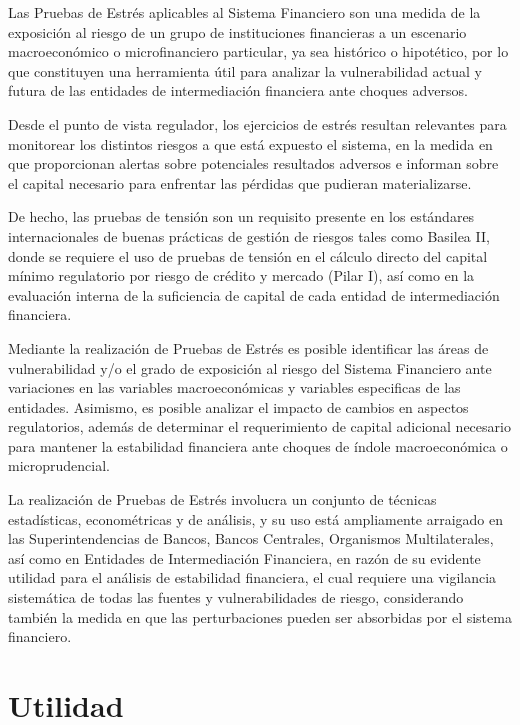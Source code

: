 \documentclass[
  12pt,
]{krantz}
\begin{document}
Las Pruebas de Estrés aplicables al Sistema Financiero son una medida de la exposición al riesgo de un grupo de instituciones financieras a un escenario macroeconómico o microfinanciero particular, ya sea histórico o hipotético, por lo que constituyen una herramienta útil para analizar la vulnerabilidad actual y futura de las entidades de intermediación financiera ante choques adversos.

Desde el punto de vista regulador, los ejercicios de estrés resultan relevantes para monitorear los distintos riesgos a que está expuesto el sistema, en la medida en que proporcionan alertas sobre potenciales resultados adversos e informan sobre el capital necesario para enfrentar las pérdidas que pudieran materializarse.

De hecho, las pruebas de tensión son un requisito presente en los estándares internacionales de buenas prácticas de gestión de riesgos tales como Basilea II, donde se requiere el uso de pruebas de tensión en el cálculo directo del capital mínimo regulatorio por riesgo de crédito y mercado (Pilar I), así como en la evaluación interna de la suficiencia de capital de cada entidad de intermediación financiera.

Mediante la realización de Pruebas de Estrés es posible identificar las áreas de vulnerabilidad y/o el grado de exposición al riesgo del Sistema Financiero ante variaciones en las variables macroeconómicas y variables especificas de las entidades. Asimismo, es posible analizar el impacto de cambios en aspectos regulatorios, además de determinar el requerimiento de capital adicional necesario para mantener la estabilidad financiera ante choques de índole macroeconómica o microprudencial.

La realización de Pruebas de Estrés involucra un conjunto de técnicas estadísticas, econométricas y de análisis, y su uso está ampliamente arraigado en las Superintendencias de Bancos, Bancos Centrales, Organismos Multilaterales, así como en Entidades de Intermediación Financiera, en razón de su evidente utilidad para el análisis de estabilidad financiera, el cual requiere una vigilancia sistemática de todas las fuentes y vulnerabilidades de riesgo, considerando también la medida en que las perturbaciones pueden ser absorbidas por el sistema financiero.

\hypertarget{utilidad}{%
\section{Utilidad}\label{utilidad}}
\end{document}
